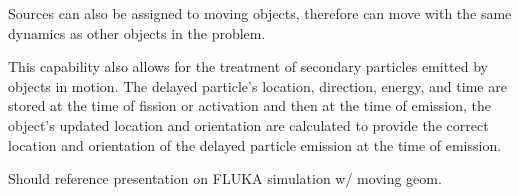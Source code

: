 Sources can also be assigned to moving objects, therefore can move with the
same dynamics as other objects in the problem.

This capability also allows for the treatment of secondary particles emitted by
objects in motion. The delayed particle's location, direction, energy, and
time are stored at the time of fission or activation and then at the time of
emission, the object's updated location and orientation are calculated to
provide the correct location and orientation of the delayed particle emission
at the time of emission. 

Should reference presentation on FLUKA simulation w/ moving geom.


